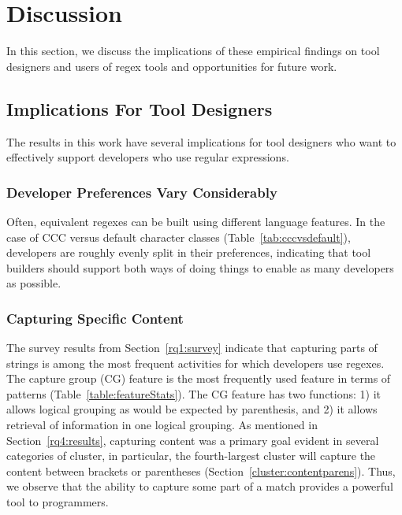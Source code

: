\section{Discussion}
\label{sec:discussion}

In this section, we discuss the implications of these empirical findings on tool designers and users of regex tools and opportunities for future work.

\subsection{Implications For Tool Designers}
The results in this work have several implications for tool designers who want to effectively support developers who use regular expressions.

\subsubsection{Developer Preferences Vary Considerably}
Often, equivalent regexes can be built using different language features. In the case of CCC versus default character classes (Table~\ref{tab:cccvsdefault}), developers are roughly evenly split in their preferences, indicating that tool builders should support both ways of doing things to enable as many developers as possible. 

\subsubsection{Capturing Specific Content}
The survey results from Section~\ref{rq1:survey} indicate that capturing parts of strings is among the most frequent activities for which developers use regexes.
The capture group (CG) feature is the most frequently used feature in terms of patterns (Table~\ref{table:featureStats}).  The CG feature has two functions: 1) it allows logical grouping as would be expected by parenthesis, and 2) it allows retrieval of information in one logical grouping.  As mentioned in Section~\ref{rq4:results}, capturing content was a primary goal evident in several categories of cluster, in particular, the fourth-largest cluster will capture the content between brackets or parentheses (Section~\ref{cluster:contentparens}).  Thus, we observe that the ability to capture some part of a match provides a powerful tool to programmers.

